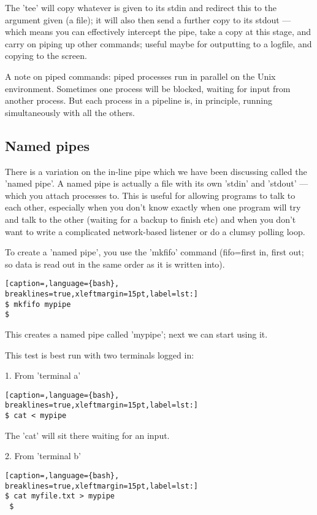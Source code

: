 The 'tee' will copy whatever is given to its stdin and redirect this to the
argument given (a file); it will also then send a further copy to its stdout
--- which means you can effectively intercept the pipe, take a copy at this
stage, and carry on piping up other commands; useful maybe for outputting to a
logfile, and copying to the screen.

A note on piped commands: piped processes run in parallel on the Unix
environment. Sometimes one process will be blocked, waiting for input from
another process. But each process in a pipeline is, in principle, running
simultaneously with all the others.

\subsection{Named pipes}
There is a variation on the in-line pipe which we have been discussing called
the 'named pipe'. A named pipe is actually a file with its own 'stdin' and
'stdout' --- which you attach processes to. This is useful for allowing
programs to talk to each other, especially when you don't know exactly when one
program will try and talk to the other (waiting for a backup to finish etc) and
when you don't want to write a complicated network-based listener or do a
clumsy polling loop.

To create a 'named pipe', you use the 'mkfifo' command (fifo=first in, first
out; so data is read out in the same order as it is written into).
\lstset{basicstyle=\scriptsize, numbers=left, captionpos=b, tabsize=4}
\begin{lstlisting}[caption=,language={bash},
breaklines=true,xleftmargin=15pt,label=lst:]
$ mkfifo mypipe 
$
\end{lstlisting}

This creates a named pipe called 'mypipe'; next we can start using it.

This test is best run with two terminals logged in:

1. From 'terminal a'
\lstset{basicstyle=\scriptsize, numbers=left, captionpos=b, tabsize=4}
\begin{lstlisting}[caption=,language={bash},
breaklines=true,xleftmargin=15pt,label=lst:]
$ cat < mypipe
\end{lstlisting}

The 'cat' will sit there waiting for an input.

2. From 'terminal b'
\lstset{basicstyle=\scriptsize, numbers=left, captionpos=b, tabsize=4}
\begin{lstlisting}[caption=,language={bash},
breaklines=true,xleftmargin=15pt,label=lst:]
$ cat myfile.txt > mypipe 
 $
\end{lstlisting}

